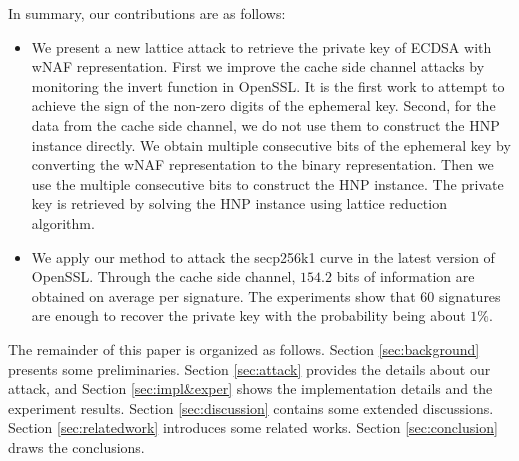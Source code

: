 

In summary, our contributions are as follows:
\begin{itemize}
  \item
  We present a new lattice attack to retrieve the private key of ECDSA with wNAF representation.
  First we
    improve the cache side channel attacks by monitoring
      the invert function in OpenSSL.
      It is the first work to attempt to achieve the sign of the non-zero digits of the ephemeral key.
   Second, for the data from the cache side channel, we do not use them to construct the HNP instance directly.
    We obtain multiple consecutive bits of the ephemeral key by converting the wNAF representation to the binary representation.
    Then we use the multiple consecutive bits to construct the HNP instance.
The private key is retrieved by solving the HNP instance using lattice reduction algorithm.

  \item
    We apply our method to attack the secp256k1 curve in the latest version of OpenSSL.
     Through the cache side channel, $154.2$ bits of information are obtained on average per signature.
    The experiments show that $60$ signatures are enough to recover the private key with the probability being about $1\%$.
\end{itemize}

The remainder of this paper is organized as follows.
Section \ref{sec:background} presents some preliminaries.
Section \ref{sec:attack} provides the details about our attack,
and Section \ref{sec:impl&exper} shows the implementation details and the experiment results.
Section \ref{sec:discussion} contains some extended discussions.
Section \ref{sec:relatedwork} introduces some related works.
Section \ref{sec:conclusion} draws the conclusions.

%
%

